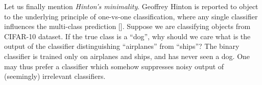 Let us finally mention \emph{Hinton's minimality}. Geoffrey Hinton is reported to object to the underlying principle of one-vs-one classification, where any single classifier influences the multi-class prediction [\cite[p.~467]{hastie1998classification}]. Suppose we are classifying objects from CIFAR-10 dataset.  If the true class is  a ``dog'', why should we care what is the output of the classifier distinguishing ``airplanes'' from ``ships''? The binary classifier is trained only on airplanes and ships, and has never seen a dog. One may thus prefer a classifier which somehow suppresses noisy output of (seemingly) irrelevant classifiers.



